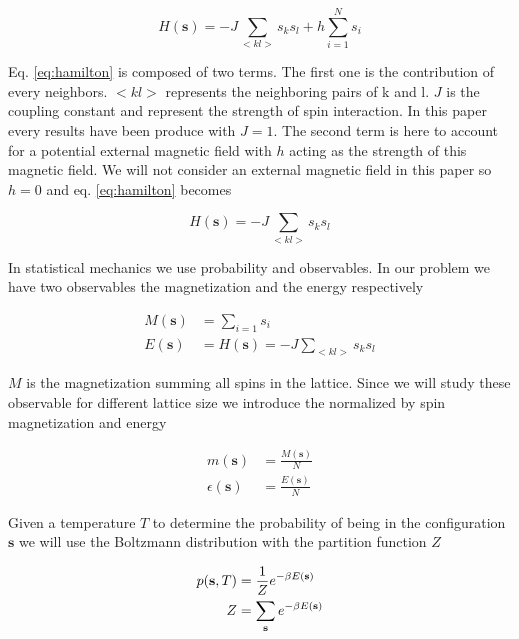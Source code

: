 \documentclass[english,notitlepage,reprint,nofootinbib]{revtex4-2}  %
\begin{document}
	\begin{equation}
		H(\textbf{s}) = -J \sum_{<kl>} s_ks_l + h \sum_{i=1}^{N} s_i \label{eq:hamilton}
	\end{equation}
	
	Eq. \ref{eq:hamilton} is composed of two terms. The first one is the contribution of every 
	neighbors. $<kl>$ represents the neighboring pairs of k and l. $J$ is the coupling constant 
	and represent the strength of spin interaction. In this paper every results have been 
	produce with $J=1$. The second term is here to account for a potential external magnetic 
	field with $h$ acting as the strength of this magnetic field. We will not consider an 
	external magnetic field in this paper so $h=0$ and eq. \ref{eq:hamilton} becomes
	
	\begin{equation}
		H(\textbf{s}) = -J \sum_{<kl>} s_ks_l \label{eq:Hamiltonian}
	\end{equation}
	
	In statistical mechanics we use probability and observables. In our problem we have two 
	observables the magnetization and the energy respectively 
	
	\begin{align}
		M(\textbf{s}) &= \sum_{i=1} s_i \label{eq:M}\\
		E(\textbf{s}) &= H(\textbf{s}) = -J \sum_{<kl>} s_ks_l \label{eq:E}
	\end{align}

	$M$ is the magnetization summing all spins in the lattice. Since we will study these 
	observable for different lattice size we introduce the normalized by spin magnetization and
	energy 
	
	\begin{align}
		m(\textbf{s}) &= \frac{M(\textbf{s})}{N} \label{eq:m} \\   
		\epsilon(\textbf{s}) &= \frac{E(\textbf{s})}{N}  \label{eq:epsilon}
	\end{align}

	
	Given a temperature $T$ to determine the probability of being in the configuration
	$\textbf{s}$ we will use the Boltzmann distribution with the partition function $Z$
	
	\begin{align}
		p(\textbf{s},T) &= \frac{1}{Z} e^{-\beta E(\textbf{s})} \label{eq:B_probability} \\
		Z &= \sum_{\text{\textbf{s}}} e^{-\beta E(\textbf{s})} \label{eq:partition_fun}
	\end{align}
\end{document}

